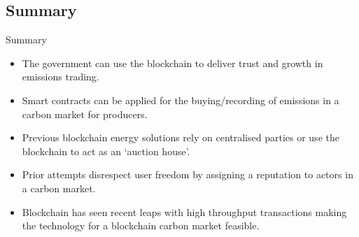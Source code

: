 \subsection{Summary}
\begin{frame}{Summary}
    \begin{itemize}
        \item The government can use the blockchain to deliver trust and growth
              in emissions trading.
        \item Smart contracts can be applied for the buying/recording of
              emissions in a carbon market for producers.
        \item Previous blockchain energy
              solutions rely on centralised parties
              or use the blockchain to act as an `auction house'.
        \item Prior attempts disrespect user freedom by assigning a
              reputation to actors in a carbon market.
        \item Blockchain has seen recent leaps with high throughput transactions
              making the technology for a blockchain carbon market feasible.
    \end{itemize}
\end{frame}